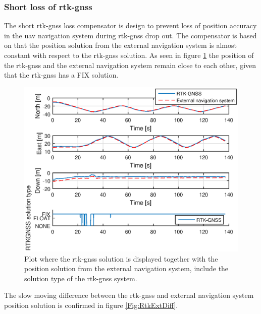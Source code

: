 \subsubsection{Short loss of \gls{rtk-gnss}}\label{ss:ShortLoss}
The short \gls{rtk-gnss} loss compensator is design to prevent loss of position accuracy in the \gls{uav} navigation system during \gls{rtk-gnss} drop out. The compensator is based on that the position solution from the external navigation system is almost constant with respect to the \gls{rtk-gnss} solution. As seen in figure \ref{Fig:RTKExternal} the position of the \gls{rtk-gnss} and the external navigation system remain close to each other, given that the \gls{rtk-gnss} has a FIX solution. 
\begin{figure}[H]
\centering
\includegraphics[scale=0.8]{figs/Experiment/RtkExternal.eps}
\caption{Plot where the \gls{rtk-gnss} solution is displayed together with the position solution from the external navigation system, include the solution type of the \gls{rtk-gnss} system.}
\label{Fig:RTKExternal}
\end{figure}
The slow moving difference between the \gls{rtk-gnss} and external navigation system position solution is confirmed in figure \ref{Fig:RtkExtDiff}.

